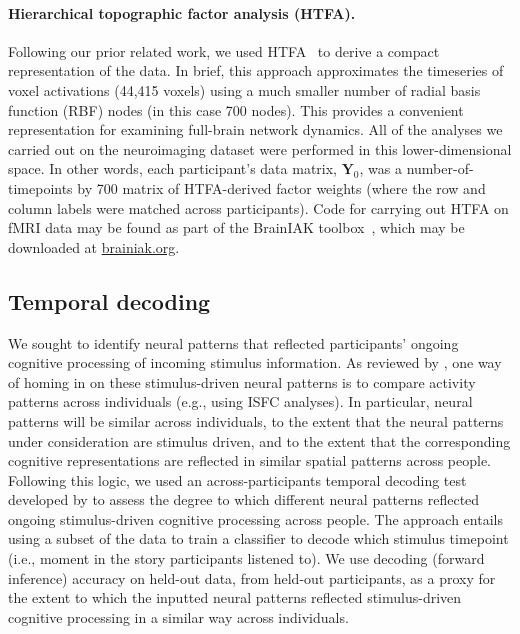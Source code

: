 \documentclass[english]{article}
\begin{document}
\paragraph{Hierarchical topographic factor analysis (HTFA).}
Following our prior related work, we used HTFA~\citep{MannEtal18} to
derive a compact representation of the data.  In brief, this approach
approximates the timeseries of voxel activations (44,415 voxels) using
a much smaller number of radial basis function (RBF) nodes (in this case 700
nodes).  This provides a convenient representation for examining
full-brain network dynamics.  All of the analyses we carried out on
the neuroimaging dataset were performed in this lower-dimensional
space.  In other words, each participant's data matrix,
$\mathbf{Y}_0$, was a number-of-timepoints by 700 matrix of
HTFA-derived factor weights (where the row and column labels were
matched across participants).  Code for carrying out HTFA on fMRI data
may be found as part of the BrainIAK toolbox~\citep{brainiak}, which
may be downloaded at \href{https://brainiak.org/}{brainiak.org}.

\subsection*{Temporal decoding}
We sought to identify neural patterns that reflected participants'
ongoing cognitive processing of incoming stimulus information.  As
reviewed by \cite{SimoEtal16}, one way of homing in on these
stimulus-driven neural patterns is to compare activity patterns across
individuals (e.g., using ISFC analyses).  In particular, neural
patterns will be similar across individuals, to the extent that the
neural patterns under consideration are stimulus driven, and to the
extent that the corresponding cognitive representations are reflected
in similar spatial patterns across people.  Following this logic, we
used an across-participants temporal decoding test developed by
\cite{MannEtal18} to assess the degree to which different neural
patterns reflected ongoing stimulus-driven cognitive processing across
people.  The approach entails using a subset of the data to train a
classifier to decode which stimulus timepoint (i.e., moment in the
story participants listened to).  We use decoding (forward inference)
accuracy on held-out data, from held-out participants, as a proxy for
the extent to which the inputted neural patterns reflected
stimulus-driven cognitive processing in a similar way across
individuals.
\end{document}
